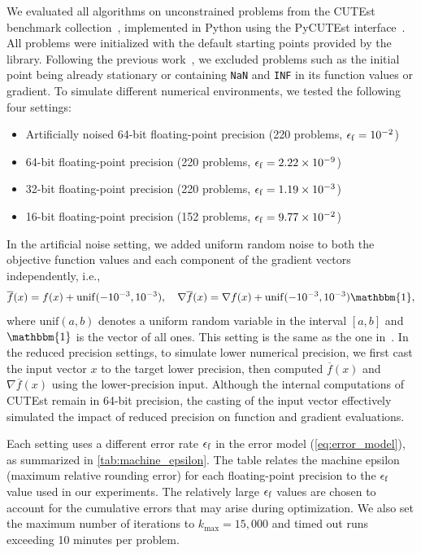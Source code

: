 \documentclass[journal]{subfiles}
\begin{document}
We evaluated all algorithms on unconstrained problems from the CUTEst benchmark collection~\citep{gouldCUTEstConstrainedUnconstrained2015}, implemented in Python using the PyCUTEst interface~\citep{PyCUTEst2022}.
All problems were initialized with the default starting points provided by the library.
Following the previous work~\citep{kanzowRegularizationLimitedMemory2023}, we excluded problems such as the initial point being already stationary or containing \texttt{NaN} and \texttt{INF} in its function values or gradient.
To simulate different numerical environments, we tested the following four settings:
\begin{itemize}
    \item Artificially noised 64-bit floating-point precision (220 problems, $\epsilon_\mathrm{f}=10^{-2}$)
    \item 64-bit floating-point precision (220 problems, $\epsilon_\mathrm{f}=2.22 \times 10^{-9}$)
    \item 32-bit floating-point precision (220 problems, $\epsilon_\mathrm{f}=1.19 \times 10^{-3}$)
    \item 16-bit floating-point precision (152 problems, $\epsilon_\mathrm{f}=9.77 \times 10^{-2}$)
\end{itemize}
In the artificial noise setting, we added uniform random noise to both the objective function values and each component of the gradient vectors independently, i.e.,
\begin{equation*}
    \overline{f}(x) = f(x) + \mathrm{unif}(-10^{-3}, 10^{-3}), \quad
    \nabla \overline{f}(x) = \nabla f(x) + \mathrm{unif}(-10^{-3}, 10^{-3}) \mathbbm{1},
\end{equation*}
where $\mathrm{unif}(a,b)$ denotes a uniform random variable in the interval $[a,b]$ and $\mathbbm{1}$ is the vector of all ones.
This setting is the same as the one in~\citep{shiNoiseTolerantQuasiNewtonAlgorithm2022}.
In the reduced precision settings, to simulate lower numerical precision, we first cast the input vector $x$ to the target lower precision, then computed $\overline{f}(x)$ and $\nabla \overline{f}(x)$ using the lower-precision input.
Although the internal computations of CUTEst remain in 64-bit precision, the casting of the input vector effectively simulated the impact of reduced precision on function and gradient evaluations.

Each setting uses a different error rate $\epsilon_\mathrm{f}$ in the error model (\cref{eq:error_model}), as summarized in \cref{tab:machine_epsilon}.
The table relates the machine epsilon (maximum relative rounding error) for each floating-point precision to the $\epsilon_\mathrm{f}$ value used in our experiments. The relatively large $\epsilon_\mathrm{f}$ values are chosen to account for the cumulative errors that may arise during optimization.
We also set the maximum number of iterations to $k_{\max} = 15{,}000$ and timed out runs exceeding 10 minutes per problem.
\end{document}
